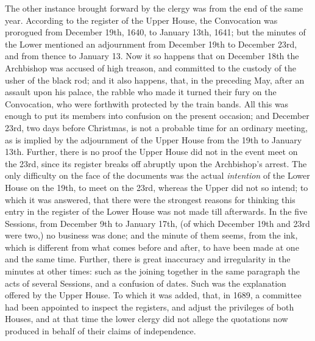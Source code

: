 The other instance brought
forward by the clergy was from the end of the same year. According to
the register of the Upper House, the Convocation was prorogued from
December 19th, 1640, to January 13th, 1641; but the minutes of the
Lower mentioned an adjournment from December 19th to December 23rd,
and from thence to January 13. Now it so happens that on December 18th
the Archbishop was accused of high treason, and committed to the
custody of the usher of the black rod; and it also happens, that, in
the preceding May, after an assault upon his palace, the rabble who
made it turned their fury on the Convocation, who were forthwith
protected by the train bands. All this was enough to put its members
into confusion on the present occasion; and December 23rd, two days
before Christmas, is not a probable time for an ordinary meeting, as
is implied by the adjournment of the Upper House from the 19th to
January 13th. Further, there is no proof the Upper House did not
in the event meet on the 23rd, since its register breaks off abruptly
upon the Archbishop's arrest. The only difficulty on the face of the
documents was the actual \emph{intention} of the Lower House on the
19th, to meet on the 23rd, whereas the Upper did not so intend; to
which it was answered, that there were the strongest reasons for
thinking this entry in the register of the Lower House was not made
till afterwards. In the five Sessions, from December 9th to January
17th, (of which December 19th and 23rd were two,) no business was
done; and the minute of them seems, from the ink, which is different
from what comes before and after, to have been made at one and the
same time. Further, there is great inaccuracy and irregularity in the
minutes at other times: such as the joining together in the same
paragraph the acts of several Sessions, and a confusion of dates. Such
was the explanation offered by the Upper House. To which it was added,
that, in 1689, a committee had been appointed to inspect the
registers, and adjust the privileges of both Houses, and at that time
the lower clergy did not allege the quotations now produced in behalf
of their claims of independence.

